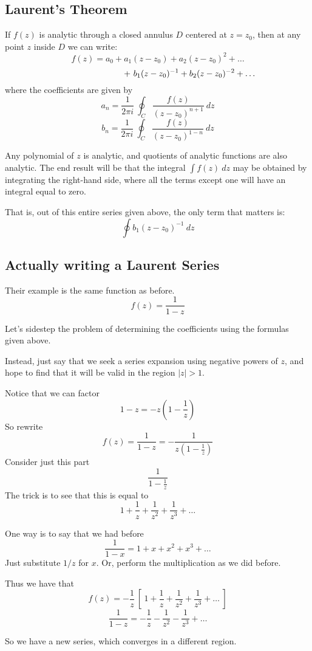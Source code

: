 \documentclass[11pt, oneside]{article}   	%
\begin{document}
\subsection*{Laurent's Theorem}
If $f(z)$ is analytic through a closed annulus $D$ centered at $z = z_0$, then at any point $z$ inside $D$ we can write:
\[ f(z) = a_0 + a_1(z-z_0) + a_2(z-z_0)^2 + \dots \]
\[ \hspace{27mm} + \ b_1(z-z_0)^{-1} + b_2(z-z_0)^{-2} + \dots \]
where the coefficients are given by
\[ a_n = \frac{1}{2 \pi i} \ \oint_C \frac{f(z)}{(z - z_0)^{n+1}} \ dz \]
\[ b_n = \frac{1}{2 \pi i} \ \oint_C \frac{f(z)}{(z - z_0)^{1-n}} \ dz \]

Any polynomial of $z$ is analytic, and quotients of analytic functions are also analytic.  The end result will be that the integral $\int f(z) \ dz$ may be obtained by integrating the right-hand side, where all the terms except one will have an integral equal to zero.

That is, out of this entire series given above, the only term that matters is:
\[ \oint b_1(z-z_0)^{-1} \ dz \]

\subsection*{Actually writing a Laurent Series}
Their example is the same function as before.
\[ f(z) = \frac{1}{1-z} \]

Let's sidestep the problem of determining the coefficients using the formulas given above.

Instead, just say that we seek a series expansion using negative powers of $z$, and hope to find that it will be valid in the region $|z| > 1$.

Notice that we can factor
\[ 1 - z = -z (1 - \frac{1}{z}) \]
So rewrite
\[ f(z) = \frac{1}{1-z} = -\frac{1}{z (1 - \frac{1}{z})} \]
Consider just this part
\[ \frac{1}{1 - \frac{1}{z}} \]
The trick is to see that this is equal to 
\[ 1 + \frac{1}{z} + \frac{1}{z^2} + \frac{1}{z^3} + \dots \]

One way is to say that we had before
\[ \frac{1}{1 - x} = 1 + x + x^2 + x^3 + \dots \]
Just substitute $1/z$ for $x$.  Or, perform the multiplication as we did before.  

Thus we have that
\[ f(z) = -\frac{1}{z} \ [ \ 1 + \frac{1}{z} + \frac{1}{z^2} + \frac{1}{z^3} + \dots \ ] \]
\[ \frac{1}{1-z} = - \frac{1}{z} - \frac{1}{z^2} - \frac{1}{z^3} + \dots \]

So we have a new series, which converges in a different region.
\end{document}
